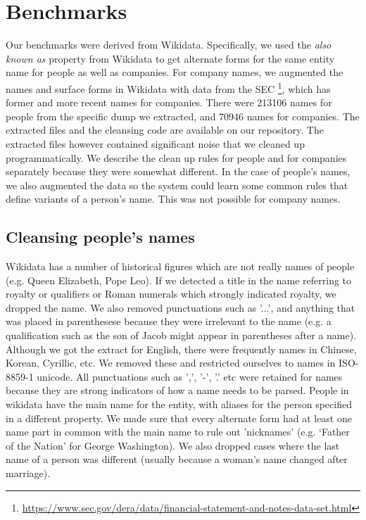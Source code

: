 \section{Benchmarks}
\label{datasets}
Our benchmarks were derived from Wikidata.  Specifically, we used the \textit{also known as} property from Wikidata to get alternate forms for the same entity name for people as well as companies.  For company names, we augmented the names and surface forms in Wikidata with data from the SEC \footnote{\url{https://www.sec.gov/dera/data/financial-statement-and-notes-data-set.html}}, which has former and more recent names for companies.  There were 213106 names for people from the specific dump we extracted, and 70946 names for companies.  The extracted files and the cleansing code are available on our repository. The extracted files however contained significant noise that we cleaned up programmatically.  We describe the clean up rules for people and for companies separately because they were somewhat different.  In the case of people's names, we also augmented the data so the system could learn some common rules that define variants of a person's name.  This was not possible for company names.

\subsection{Cleansing people's names}
Wikidata has a number of historical figures which are not really names of people (e.g. Queen Elizabeth, Pope Leo).  If we detected a title in the name referring to royalty or qualifiers or Roman numerals which strongly indicated royalty, we dropped the name.  We also removed punctuations such as '...', and anything that was placed in parenthesese because they were irrelevant to the name (e.g. a qualification such as the son of Jacob might appear in parentheses after a name).  Although we got the extract for English, there were frequently names in Chinese, Korean, Cyrillic, etc.  We removed these and restricted ourselves to names in ISO-8859-1 unicode.  All punctuations such as ',', '-', '.' etc were retained for names because they are strong indicators of how a name needs to be parsed.  People in wikidata have the main name for the entity, with aliases for the person specified in a different property.  We made sure that every alternate form had at least one name part in common with the main name to rule out 'nicknames' (e.g. `Father of the Nation' for George Washington).  We also dropped cases where the last name of a person was different (usually because a woman's name changed after marriage).      

